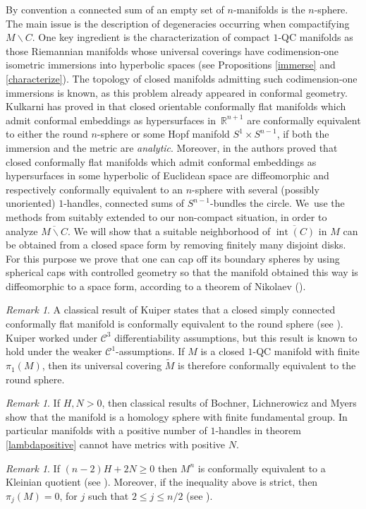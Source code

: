 \documentclass[10pt]{amsart}
\let\mathcal\mathscr
\let\moins\smallsetminus
\DeclareMathOperator{\inte}{int}
\theoremstyle{definition}
\theoremstyle{remark}
\newtheorem{remark}[theorem]{Remark}
\numberwithin{equation}{section}
\begin{document}
By convention a connected sum of an empty set of $n$-manifolds is the $n$-sphere. The main issue is the description of degeneracies occurring when compactifying $M\moins C$. One key ingredient is the characterization of compact $1$-QC manifolds as those Riemannian manifolds whose universal coverings have codimension-one isometric immersions into hyperbolic spaces (see
Propositions \ref{immerse} and \ref{characterize}). The topology of closed manifolds admitting such
codimension-one immersions is known, as this problem already appeared in conformal geometry. Kulkarni has proved in \cite{Kul} that closed orientable
conformally flat manifolds which admit conformal embeddings as hypersurfaces in~$\mathbb R^{n+1}$ are conformally equivalent to either the round $n$-sphere or
some Hopf manifold $S^1\times S^{n-1}$, if both
the immersion and the metric are \emph{analytic}. Moreover, in \cite{DDM,Pi} the authors proved that closed conformally flat manifolds which admit conformal embeddings as hypersurfaces in some
hyperbolic of Euclidean space are diffeomorphic and respectively
conformally equivalent to an $n$-sphere with several (possibly unoriented)
$1$-handles, \ie connected sums of $S^{n-1}$-bundles the circle. We~use the methods from \cite{DDM,Pi} suitably extended
to our non-compact situation, in order to analyze $\overline{M\moins C}$. We will show that a suitable neighborhood
of $\overline{\inte (C)}$ in $M$ can be obtained from a closed space form by removing finitely many
disjoint disks. For this purpose we prove that one can cap off its boundary spheres by using spherical caps with controlled geometry so that the manifold obtained this way is diffeomorphic to a space form, according to a theorem of Nikolaev (\cite{Nik}).

\begin{remark}
A classical result of Kuiper states that a closed simply connected conformally flat manifold is conformally equivalent
to the round sphere (see \cite{Ku1}). Kuiper worked under $\mathcal C^3$ differentiability assumptions, but
this result is known to hold under the weaker $\mathcal C^1$-assumptions.
If $M$ is a closed $1$-QC manifold with finite $\pi_1(M)$, then its universal covering $\widetilde{M}$
is therefore conformally equivalent to the round sphere.
\end{remark}

\begin{remark}
If $H, N >0$, then
classical results of Bochner, Lichnerowicz and Myers show
that the manifold is a homology sphere with finite
fundamental group. In particular manifolds with a positive number of $1$\nobreakdash-handles in theorem \ref{lambdapositive}
cannot have metrics with positive $N$.
\end{remark}
\begin{remark}
If $(n-2)H + 2N \geq 0$ then $M^n$ is conformally equivalent to a
Kleinian quotient (see \cite[Th.\,4.5]{SY}). Moreover, if the inequality above is strict, then
$\pi_j(M)=0$, for $j$ such that $2\leq j\leq n/2$ (see \cite[Th.\,4.6]{SY}).
\end{remark}
\end{document}

